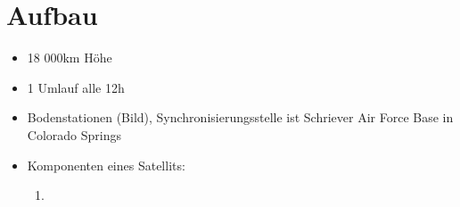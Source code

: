 \documentclass{scrartcl}
\begin{document}
    \section{Aufbau}
    \begin{itemize}
        \item 18 000km Höhe
        \item 1 Umlauf alle 12h
        \item Bodenstationen (Bild), Synchronisierungsstelle ist Schriever Air Force Base in Colorado Springs
        \item Komponenten eines Satellits:
        \begin{enumerate}
            \item
        \end{enumerate}
    \end{itemize}
\end{document}
